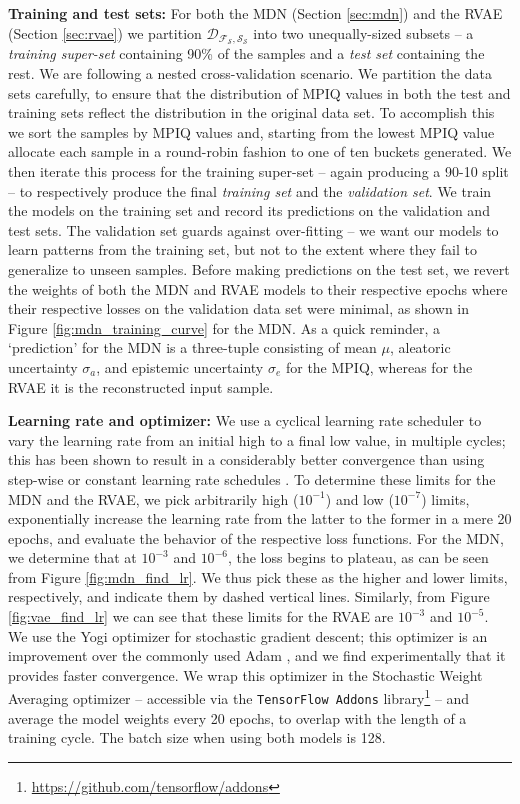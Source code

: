 {\bf Training and test sets:} For both the MDN (Section \ref{sec:mdn}) and the RVAE (Section \ref{sec:rvae}) we partition $\mathcal{D_{F_S,S_S}}$ into two unequally-sized subsets -- a {\it training super-set} containing 90\% of the samples and a {\it test set} containing the rest. We are following a nested cross-validation scenario. We partition the data sets carefully, to ensure that the distribution of MPIQ values in both the test and training sets reflect the distribution in the original data set. To accomplish this we sort the samples by MPIQ values and, starting from the lowest MPIQ value allocate each sample in a round-robin fashion to one of ten buckets generated. We then iterate this process for the training super-set -- again producing a 90-10 split -- to respectively produce the final {\it training set} and the {\it validation set}. We train the models on the training set and record its predictions on the validation and test sets. The validation set guards against over-fitting -- we want our models to learn patterns from the training set, but not to the extent where they fail to generalize to unseen samples. Before making predictions on the test set, we revert the weights of both the MDN and RVAE models to their respective epochs where their respective losses on the validation data set were minimal, as shown in Figure \ref{fig:mdn_training_curve} for the MDN. As a quick reminder, a `prediction' for the MDN is a three-tuple consisting of mean $\mu$, aleatoric uncertainty $\sigma_a$, and epistemic uncertainty $\sigma_e$ for the MPIQ, whereas for the RVAE it is the reconstructed input sample.

{\bf Learning rate and optimizer:} We use a cyclical learning rate scheduler to vary the learning rate from an initial high to a final low value, in multiple cycles; this has been shown to result in a considerably better convergence than using step-wise or constant learning rate schedules \citep{cyclical_learning_rate}. To determine these limits for the MDN and the RVAE, we pick arbitrarily high ($10^{-1}$) and low ($10^{-7}$) limits, exponentially increase the learning rate from the latter to the former in a mere 20 epochs, and evaluate the behavior of the respective loss functions. For the MDN, we determine that at $10^{-3}$ and $10^{-6}$, the loss begins to plateau, as can be seen from Figure \ref{fig:mdn_find_lr}. We thus pick these as the higher and lower limits, respectively, and indicate them by dashed vertical lines. Similarly, from Figure \ref{fig:vae_find_lr} we can see that these limits for the RVAE are $10^{-3}$ and $10^{-5}$. We use the Yogi optimizer \citep{yogi_optimizer} for stochastic gradient descent; this optimizer is an improvement over the commonly used Adam \citep{adam_optimizer}, and we find experimentally that it provides faster convergence. We wrap this optimizer in the Stochastic Weight Averaging optimizer \citep{swa_stochastic_weight_averaging} -- accessible via the \texttt{TensorFlow Addons} library\footnote{\url{https://github.com/tensorflow/addons}} -- and average the model weights every 20 epochs, to overlap with the length of a training cycle. The batch size when using both models is 128.

